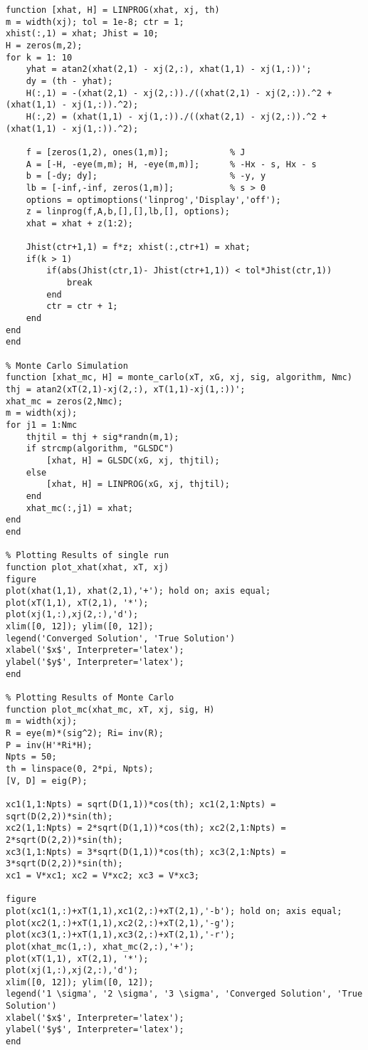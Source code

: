 \documentclass{article}
\begin{document}
\begin{lstlisting}[style=Matlab-editor]
% Linear Program Model
function [xhat, H] = LINPROG(xhat, xj, th)
m = width(xj); tol = 1e-8; ctr = 1;
xhist(:,1) = xhat; Jhist = 10; 
H = zeros(m,2);
for k = 1: 10
    yhat = atan2(xhat(2,1) - xj(2,:), xhat(1,1) - xj(1,:))';
    dy = (th - yhat);
    H(:,1) = -(xhat(2,1) - xj(2,:))./((xhat(2,1) - xj(2,:)).^2 + (xhat(1,1) - xj(1,:)).^2);
    H(:,2) = (xhat(1,1) - xj(1,:))./((xhat(2,1) - xj(2,:)).^2 + (xhat(1,1) - xj(1,:)).^2);
    
    f = [zeros(1,2), ones(1,m)];            % J
    A = [-H, -eye(m,m); H, -eye(m,m)];      % -Hx - s, Hx - s
    b = [-dy; dy];                          % -y, y
    lb = [-inf,-inf, zeros(1,m)];           % s > 0
    options = optimoptions('linprog','Display','off');
    z = linprog(f,A,b,[],[],lb,[], options);
    xhat = xhat + z(1:2);

    Jhist(ctr+1,1) = f*z; xhist(:,ctr+1) = xhat;
    if(k > 1)
        if(abs(Jhist(ctr,1)- Jhist(ctr+1,1)) < tol*Jhist(ctr,1))
            break
        end
        ctr = ctr + 1;
    end
end
end

% Monte Carlo Simulation
function [xhat_mc, H] = monte_carlo(xT, xG, xj, sig, algorithm, Nmc)
thj = atan2(xT(2,1)-xj(2,:), xT(1,1)-xj(1,:))';
xhat_mc = zeros(2,Nmc);
m = width(xj);
for j1 = 1:Nmc
    thjtil = thj + sig*randn(m,1);
    if strcmp(algorithm, "GLSDC") 
        [xhat, H] = GLSDC(xG, xj, thjtil);
    else
        [xhat, H] = LINPROG(xG, xj, thjtil);
    end
    xhat_mc(:,j1) = xhat;
end
end

% Plotting Results of single run
function plot_xhat(xhat, xT, xj)
figure
plot(xhat(1,1), xhat(2,1),'+'); hold on; axis equal;
plot(xT(1,1), xT(2,1), '*');
plot(xj(1,:),xj(2,:),'d');
xlim([0, 12]); ylim([0, 12]);
legend('Converged Solution', 'True Solution')
xlabel('$x$', Interpreter='latex'); 
ylabel('$y$', Interpreter='latex');
end

% Plotting Results of Monte Carlo
function plot_mc(xhat_mc, xT, xj, sig, H)
m = width(xj);
R = eye(m)*(sig^2); Ri= inv(R);
P = inv(H'*Ri*H);
Npts = 50;
th = linspace(0, 2*pi, Npts);
[V, D] = eig(P);

xc1(1,1:Npts) = sqrt(D(1,1))*cos(th); xc1(2,1:Npts) = sqrt(D(2,2))*sin(th);
xc2(1,1:Npts) = 2*sqrt(D(1,1))*cos(th); xc2(2,1:Npts) = 2*sqrt(D(2,2))*sin(th);
xc3(1,1:Npts) = 3*sqrt(D(1,1))*cos(th); xc3(2,1:Npts) = 3*sqrt(D(2,2))*sin(th);
xc1 = V*xc1; xc2 = V*xc2; xc3 = V*xc3;

figure
plot(xc1(1,:)+xT(1,1),xc1(2,:)+xT(2,1),'-b'); hold on; axis equal;
plot(xc2(1,:)+xT(1,1),xc2(2,:)+xT(2,1),'-g');
plot(xc3(1,:)+xT(1,1),xc3(2,:)+xT(2,1),'-r');
plot(xhat_mc(1,:), xhat_mc(2,:),'+');
plot(xT(1,1), xT(2,1), '*');
plot(xj(1,:),xj(2,:),'d');
xlim([0, 12]); ylim([0, 12]);
legend('1 \sigma', '2 \sigma', '3 \sigma', 'Converged Solution', 'True Solution')
xlabel('$x$', Interpreter='latex'); 
ylabel('$y$', Interpreter='latex');
end
\end{lstlisting}
\end{document}
